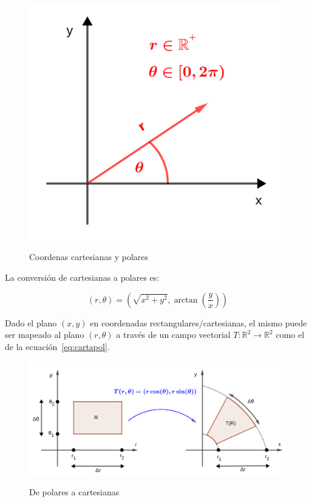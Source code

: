 \documentclass{article}
\renewcommand{\Bbb}{\mathbb}
\begin{document}
\begin{figure}[ht]
\centering
\caption{Coordenas cartesianas y polares}
\includegraphics[scale=0.8]{img/teo_fig022_cp.png}
\label{fig:cp}
\end{figure}

La conversión de cartesianas a polares es:

\begin{equation}
(r, \theta) = \left( \sqrt{x^2 + y^2}, \arctan \left( \frac{y}{x} \right) \right)
\label{eq:cartapol}
\end{equation}

Dado el plano $(x,y)$ en coordenadas rectangulares/cartesianas, el mismo puede ser mapeado al plano $(r, \theta)$ a través de un campo vectorial $T:\Bbb R^2 \rightarrow \Bbb R^2$ como el de la ecuación~\ref{eq:cartapol}.

\begin{figure}[ht]
\centering
\caption{De polares a cartesianas}
\includegraphics[scale=0.8]{img/teo_fig023_ccp.png}
\label{fig:polacart}
\end{figure}
\end{document}
